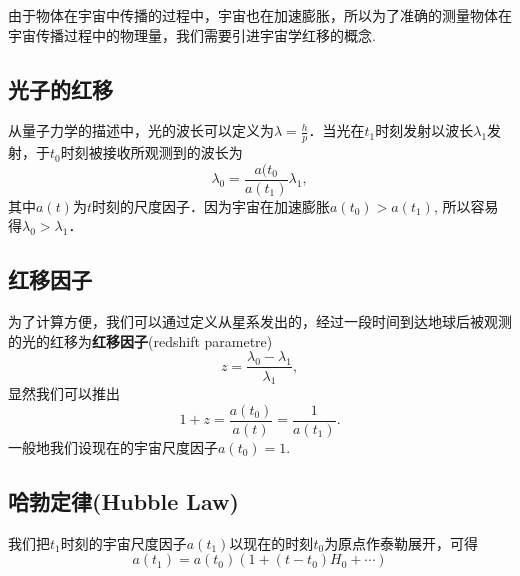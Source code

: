 
由于物体在宇宙中传播的过程中，宇宙也在加速膨胀，所以为了准确的测量物体在宇宙传播过程中的物理量，我们需要引进宇宙学红移的概念.

\subsection{光子的红移}
从量子力学的描述中，光的波长可以定义为$\lambda=\frac{h}{p}$．当光在$t_1$时刻发射以波长$\lambda_1$发射，于$t_0$时刻被接收所观测到的波长为
\begin{equation}
\lambda_0=\frac{a(t_0}{a(t_1)}\lambda_1,
\end{equation}
其中$a(t)$为$t$时刻的尺度因子．因为宇宙在加速膨胀$a(t_0)>a(t_1)$, 所以容易得$\lambda_0>\lambda_1$．

\subsection{红移因子}
为了计算方便，我们可以通过定义从星系发出的，经过一段时间到达地球后被观测的光的红移为\textbf{红移因子}(redshift parametre)
\begin{equation}
z=\frac{\lambda_0-\lambda_1}{\lambda_1},
\end{equation}
显然我们可以推出
\begin{equation}
1+z=\frac{a(t_0)}{a(t)}=\frac{1}{a(t_1)}.
\end{equation}
一般地我们设现在的宇宙尺度因子$a(t_0)=1$.

\subsection{哈勃定律(Hubble Law)}
我们把$t_1$时刻的宇宙尺度因子$a(t_1)$以现在的时刻$t_0$为原点作泰勒展开，可得
\begin{equation}
a(t_1)=a(t_0)(1+(t-t_0)H_0+\cdots)
\end{equation}
